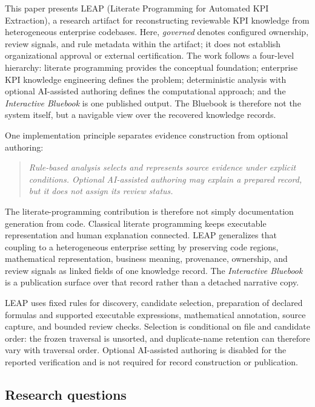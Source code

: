 \documentclass[a4paper,fleqn]{cas-dc}
\newcommand{\tool}{\textsc{LEAP}}
\newcommand{\bluebook}{\emph{Interactive Bluebook}}
\begin{document}
This paper presents \tool{} (Literate Programming for Automated KPI Extraction), a research artifact for reconstructing reviewable KPI knowledge from heterogeneous enterprise codebases. Here, \emph{governed} denotes configured ownership, review signals, and rule metadata within the artifact; it does not establish organizational approval or external certification. The work follows a four-level hierarchy: literate programming provides the conceptual foundation; enterprise KPI knowledge engineering defines the problem; deterministic analysis with optional AI-assisted authoring defines the computational approach; and the \bluebook{} is one published output. The Bluebook is therefore not the system itself, but a navigable view over the recovered knowledge records.

One implementation principle separates evidence construction from optional authoring:

\begin{quote}
\emph{Rule-based analysis selects and represents source evidence under explicit conditions. Optional AI-assisted authoring may explain a prepared record, but it does not assign its review status.}
\end{quote}

The literate-programming contribution is therefore not simply documentation generation from code. Classical literate programming keeps executable representation and human explanation connected. \tool{} generalizes that coupling to a heterogeneous enterprise setting by preserving code regions, mathematical representation, business meaning, provenance, ownership, and review signals as linked fields of one knowledge record. The \bluebook{} is a publication surface over that record rather than a detached narrative copy.

\tool{} uses fixed rules for discovery, candidate selection, preparation of declared formulas and supported executable expressions, mathematical annotation, source capture, and bounded review checks. Selection is conditional on file and candidate order: the frozen traversal is unsorted, and duplicate-name retention can therefore vary with traversal order. Optional AI-assisted authoring is disabled for the reported verification and is not required for record construction or publication.

\subsection{Research questions}
\end{document}
